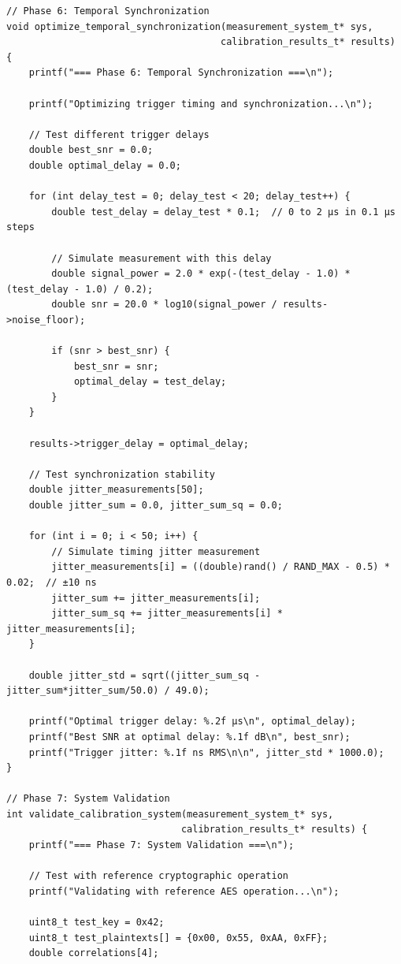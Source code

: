 \documentclass[11pt,a4paper]{article}
\theoremstyle{definition}
\begin{document}
\begin{lstlisting}[caption={Complete EM Calibration Implementation}]
// Phase 6: Temporal Synchronization
void optimize_temporal_synchronization(measurement_system_t* sys, 
                                      calibration_results_t* results) {
    printf("=== Phase 6: Temporal Synchronization ===\n");
    
    printf("Optimizing trigger timing and synchronization...\n");
    
    // Test different trigger delays
    double best_snr = 0.0;
    double optimal_delay = 0.0;
    
    for (int delay_test = 0; delay_test < 20; delay_test++) {
        double test_delay = delay_test * 0.1;  // 0 to 2 μs in 0.1 μs steps
        
        // Simulate measurement with this delay
        double signal_power = 2.0 * exp(-(test_delay - 1.0) * (test_delay - 1.0) / 0.2);
        double snr = 20.0 * log10(signal_power / results->noise_floor);
        
        if (snr > best_snr) {
            best_snr = snr;
            optimal_delay = test_delay;
        }
    }
    
    results->trigger_delay = optimal_delay;
    
    // Test synchronization stability
    double jitter_measurements[50];
    double jitter_sum = 0.0, jitter_sum_sq = 0.0;
    
    for (int i = 0; i < 50; i++) {
        // Simulate timing jitter measurement
        jitter_measurements[i] = ((double)rand() / RAND_MAX - 0.5) * 0.02;  // ±10 ns
        jitter_sum += jitter_measurements[i];
        jitter_sum_sq += jitter_measurements[i] * jitter_measurements[i];
    }
    
    double jitter_std = sqrt((jitter_sum_sq - jitter_sum*jitter_sum/50.0) / 49.0);
    
    printf("Optimal trigger delay: %.2f μs\n", optimal_delay);
    printf("Best SNR at optimal delay: %.1f dB\n", best_snr);
    printf("Trigger jitter: %.1f ns RMS\n\n", jitter_std * 1000.0);
}

// Phase 7: System Validation
int validate_calibration_system(measurement_system_t* sys, 
                               calibration_results_t* results) {
    printf("=== Phase 7: System Validation ===\n");
    
    // Test with reference cryptographic operation
    printf("Validating with reference AES operation...\n");
    
    uint8_t test_key = 0x42;
    uint8_t test_plaintexts[] = {0x00, 0x55, 0xAA, 0xFF};
    double correlations[4];
    

\end{lstlisting}
\end{document}
